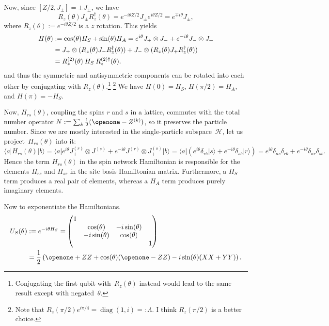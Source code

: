 \documentclass[aps,pra,12pt,nofootinbib,superscriptaddress,longbibliography,showpacs]{revtex4-1}
\theoremstyle{plain}
\theoremstyle{definition}
\newcommand{\bra}[1]{\mbox{$\langle #1|$}}
\newcommand{\ket}[1]{\ensuremath{|#1\rangle}}
\newcommand{\comm}[2]{\ensuremath{\left[#1, #2\right]}}
\DeclareMathOperator{\diag}{diag}
\newcommand{\I}{\openone}     %
\newcommand{\hilb}[1]{\ensuremath{\mathcal{#1}}} %
\newcommand{\be}{\begin{equation}}
\newcommand{\ee}{\end{equation}}
\begin{document}
Now, since $\comm{Z/2}{J_\pm} = \pm J_\pm$, we have
\be
R_z(\theta) J_\pm R_z^\dagger(\theta)
= e^{-i \theta Z/2} J_\pm e^{i \theta Z/2}
= e^{\mp i \theta} J_\pm,
\ee
where $R_z(\theta):= e^{-i \theta Z/2}$ is a $z$ rotation.
This yields
\begin{align}
\notag
H(\theta)
&:= \cos(\theta) H_S +\sin(\theta) H_A
= e^{i \theta} J_+  \otimes J_- +e^{-i \theta} J_- \otimes J_+\\
\notag
&=  J_+ \otimes (R_{z}(\theta) J_- R_{z}^\dagger(\theta)) +J_- \otimes
(R_{z}(\theta) J_+ R_{z}^\dagger(\theta))\\
&= R_{z}^{(2)}(\theta) \: H_S \: R_{z}^{(2)\dagger}(\theta).
\end{align}
and thus the symmetric and antisymmetric components can be rotated into each
other by
conjugating with $R_z(\theta)$.\footnote{Conjugating the first qubit
with~$R_z(\theta)$ instead would
lead to the same result except with negated~$\theta$.}
\footnote{Note that $R_z(\pi/2) e^{i \pi/4} = \diag(1, i) =:
  \Lambda$. I think $R_z(\pi/2)$ is a better choice.}
We have
$H(0) = H_S$, 
$H(\pi/2) = H_A$, and
$H(\pi) = -H_S$. 

Now, $H_{rs}(\theta)$, coupling the spins $r$ and $s$ in a lattice,
commutes with the total number operator
$N := \sum_k \tfrac{1}{2}(\I -Z^{(k)})$,
so it preserves the particle number. Since we are mostly interested in
the single-particle subspace~$\hilb{H}$, let us project~$H_{rs}(\theta)$ into
it:
\be
\bra{a} H_{rs}(\theta) \ket{b}
= \bra{a} e^{i \theta} J_+^{(r)}  \otimes J_-^{(s)} +e^{-i \theta} J_-^{(r)}
\otimes J_+^{(s)} \ket{b}
= \bra{a} \left(e^{i \theta} \delta_{rb} \ket{s} +e^{-i \theta} \delta_{sb}
\ket{r}\right)
= e^{i \theta} \delta_{as} \delta_{rb} +e^{-i \theta} \delta_{ar} \delta_{sb}.
\ee
Hence the term $H_{rs}(\theta)$ in the spin network Hamiltonian
is responsible for the elements $H_{rs}$ and $H_{sr}$ in the
site basis Hamiltonian matrix. Furthermore, a $H_S$ term produces
a real pair of elements, whereas a $H_A$ term produces purely
imaginary elements.

Now to exponentiate the Hamiltonians.
\begin{align}
\notag
U_S(\theta) &:= e^{-i \theta H_S}
= 
\begin{pmatrix}
1\\
& \cos(\theta) & -i \sin(\theta)\\
& -i \sin(\theta) & \cos(\theta)\\
& & & 1
\end{pmatrix}\\
&= \frac{1}{2}\left(\I +ZZ +\cos(\theta)(\I-ZZ) -i \sin(\theta)(XX+YY)\right).
\end{align}
\end{document}
